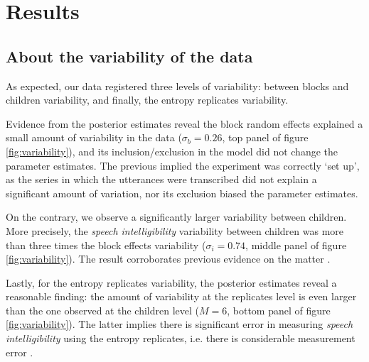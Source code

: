 \section{Results} \label{S:results}
%
\subsection{About the variability of the data} \label{sS:results_variability}
%
As expected, our data registered three levels of variability: between blocks and children variability, and finally, the entropy replicates variability.

Evidence from the posterior estimates reveal the block random effects explained a small amount of variability in the data ($\sigma_{b}=0.26$, top panel of figure \ref{fig:variability}), and its inclusion/exclusion in the model did not change the parameter estimates. The previous implied the experiment was correctly `set up', as the series in which the utterances were transcribed did not explain a significant amount of variation, nor its exclusion biased the parameter estimates.

On the contrary, we observe a significantly larger variability between children. More precisely, the \textit{speech intelligibility} variability between children was more than three times the block effects variability ($\sigma_{i}=0.74$, middle panel of figure \ref{fig:variability}). The result corroborates previous evidence on the matter \cite{Young_et_al_2002, Peng_et_al_2004, Montag_et_al_2014, Castellanos_et_al_2014, Yanbay_et_al_2014, Nittrouer_et_al_2014, Freeman_et_al_2017, Boonen_et_al_2021}. 

Lastly, for the entropy replicates variability, the posterior estimates reveal a reasonable finding: the amount of variability at the replicates level is even larger than the one observed at the children level ($M=6$, bottom panel of figure \ref{fig:variability}). The latter implies there is significant error in measuring \textit{speech intelligibility} using the entropy replicates, i.e. there is considerable measurement error \cite{Carroll_2006}.


